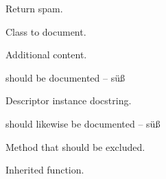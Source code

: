 \documentclass[letterpaper,10pt,english]{sphinxhowto}
\begin{document}

\begin{fulllineitems}
\label{autodoc:test_autodoc.function}
Return spam.

\end{fulllineitems}


\begin{fulllineitems}
Class to document.

Additional content.

\begin{fulllineitems}
should be documented -- süß

\end{fulllineitems}


\begin{fulllineitems}
Descriptor instance docstring.

\end{fulllineitems}


\begin{fulllineitems}
should likewise be documented -- süß

\end{fulllineitems}


\begin{fulllineitems}
Method that should be excluded.

\end{fulllineitems}


\begin{fulllineitems}
\label{autodoc:test_autodoc.Class.inheritedmeth}
Inherited function.

\end{fulllineitems}


\end{fulllineitems}
\end{document}
